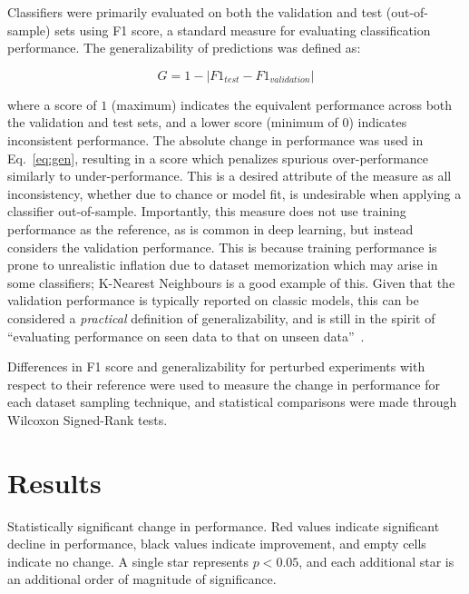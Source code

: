\documentclass[num-refs]{nbdt-article}
\begin{document}
Classifiers were primarily evaluated on both the validation and test (out-of-sample) sets using F1 score, a standard measure for evaluating classification performance. The generalizability of predictions was defined as:

\begin{equation}
G = 1 - \lvert F1_{test} - F1_{validation} \rvert
\label{eq:gen}
\end{equation}

where a score of $1$ (maximum) indicates the equivalent performance across both the validation and test sets, and a lower score (minimum of $0$) indicates inconsistent performance. The absolute change in performance was used in Eq.~\ref{eq:gen}, resulting in a score which penalizes spurious over-performance similarly to under-performance. This is a desired attribute of the measure as all inconsistency, whether due to chance or model fit, is undesirable when applying a classifier out-of-sample. Importantly, this measure does not use training performance as the reference, as is common in deep learning, but instead considers the validation performance. This is because training performance is prone to unrealistic inflation due to dataset memorization which may arise in some classifiers; K-Nearest Neighbours is a good example of this. Given that the validation performance is typically reported on classic models, this can be considered a \textit{practical} definition of generalizability, and is still in the spirit of ``evaluating performance on seen data to that on unseen data''~\cite{shorten2019survey}.

Differences in F1 score and generalizability for perturbed experiments with respect to their reference were used to measure the change in performance for each dataset sampling technique, and statistical comparisons were made through Wilcoxon Signed-Rank tests.

\section{Results}

\begin{table}[b!]
\centering
\caption{Statistically significant change in performance. Red values indicate significant
decline in performance, black values indicate improvement, and empty cells indicate no change. A single star
represents $p < 0.05$, and each additional star is an additional order of magnitude of significance.}
\label{tab1:perf}
\small

\end{table}
\end{document}
